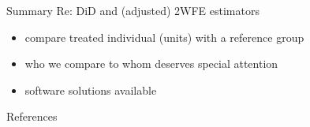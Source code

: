 \documentclass[aspectratio=169]{beamer}
\begin{document}
		\begin{frame}{Summary}
			Re: DiD and (adjusted) 2WFE estimators \\ \vspace*{.5cm}
			\begin{itemize}
				\item compare treated individual (units) with a reference group
				\item who we compare to whom deserves special attention
				\item software solutions available
			\end{itemize}
		\end{frame}

	\begin{frame}[t,allowframebreaks]{References}
	  \printbibliography
	\end{frame}
\end{document}
